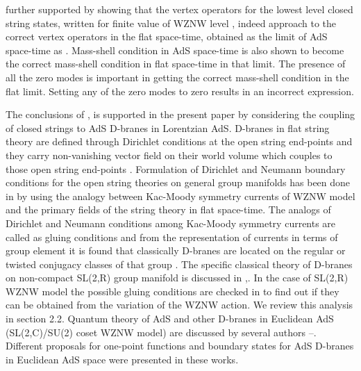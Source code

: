 \documentclass[a4paper,12pt]{article}
\begin{document}
further supported by showing that the vertex operators for the lowest level
closed string states, written for finite value of WZNW level \coordHE{}, indeed
approach to the correct vertex operators in the flat \coordHE{}
space-time, obtained as the limit of AdS\coordHE{} space-time as \coordHE{}. Mass-shell condition in AdS\coordHE{} space-time is also shown to
become the correct mass-shell condition in flat space-time in that limit.
The presence of all the zero modes is important in getting the correct
mass-shell condition in the flat limit. Setting any of the zero modes to
zero results in an incorrect expression.

The conclusions of \cite{bars1},\cite{BDM} is supported in the present paper
by considering the coupling of closed strings to AdS\coordHE{} D-branes in
Lorentzian AdS\coordHE{}. D-branes in flat string theory are defined through
Dirichlet conditions at the open string end-points and they carry
non-vanishing vector field on their world volume which couples to those open
string end-points \cite{TASI}. Formulation of Dirichlet and Neumann boundary
conditions for the open string theories on general group manifolds has been
done in \cite{stanciu-0} by using the analogy between Kac-Moody symmetry
currents of WZNW model and the primary fields of the string theory in flat
space-time. The analogs of Dirichlet and Neumann conditions among Kac-Moody
symmetry currents are called as gluing conditions and from the
representation of currents in terms of group element it is found that
classically D-branes are located on the regular or twisted conjugacy classes
of that group \cite{stanciu-0}. The specific classical theory of D-branes on
non-compact SL(2,R) group manifold is discussed in \cite{stanciu},\cite
{bachas}. In the case of SL(2,R) WZNW model the possible gluing conditions
are checked in \cite{lomholt} to find out if they can be obtained from the
variation of the WZNW action. We review this analysis in section 2.2.
Quantum theory of AdS\coordHE{} and other D-branes in Euclidean AdS\coordHE{}
(SL(2,C)/SU(2) coset WZNW model) are discussed by several authors \cite
{ads2d}--\cite{ponsot}. Different proposals for one-point functions and
boundary states for AdS\coordHE{} D-branes in Euclidean AdS\coordHE{} space were
presented in these works.
\end{document}
